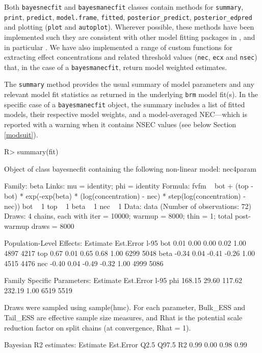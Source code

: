 \documentclass[
  shortnames]{jss}
\begin{document}
Both \texttt{bayesnecfit} and \texttt{bayesmanecfit} classes contain methods for \texttt{summary}, \texttt{print}, \texttt{predict}, \texttt{model.frame}, \texttt{fitted}, \texttt{posterior\_predict}, \texttt{posterior\_edpred} and plotting (\texttt{plot} and \newline \texttt{autoplot}). Wherever possible, these methods have been implemented such they are consistent with other model fitting packages in , and in particular . We have also implemented a range of custom functions for extracting effect concentrations and related threshold values (\texttt{nec}, \texttt{ecx} and \texttt{nsec}) that, in the case of a \texttt{bayesmanecfit}, return model weighted estimates.

The \texttt{summary} method provides the usual summary of model parameters and any relevant model fit statistics as returned in the underlying \texttt{brm} model fit(s). In the specific case of a \texttt{bayesmanecfit} object, the summary includes a list of fitted models, their respective model weights, and a model-averaged NEC---which is reported with a warning when it contains NSEC values (see below Section \ref{modsuit}).

\begin{CodeChunk}
\begin{CodeInput}
R> summary(fit)
\end{CodeInput}
\begin{CodeOutput}
Object of class bayesnecfit containing the following non-linear model: nec4param

 Family: beta 
  Links: mu = identity; phi = identity 
Formula: fvfm ~ bot + (top - bot) * exp(-exp(beta) * (log(concentration) - nec) * step(log(concentration) - nec)) 
         bot ~ 1
         top ~ 1
         beta ~ 1
         nec ~ 1
   Data: data (Number of observations: 72) 
  Draws: 4 chains, each with iter = 10000; warmup = 8000; thin = 1;
         total post-warmup draws = 8000

Population-Level Effects: 
     Estimate Est.Error l-95%
bot      0.01      0.00     0.00     0.02 1.00     4897     4217
top      0.67      0.01     0.65     0.68 1.00     6299     5048
beta    -0.34      0.04    -0.41    -0.26 1.00     4515     4476
nec     -0.40      0.04    -0.49    -0.32 1.00     4999     5086

Family Specific Parameters: 
    Estimate Est.Error l-95%
phi   168.15     29.60   117.62   232.19 1.00     6519     5519

Draws were sampled using sample(hmc). For each parameter, Bulk_ESS
and Tail_ESS are effective sample size measures, and Rhat is the potential
scale reduction factor on split chains (at convergence, Rhat = 1).


Bayesian R2 estimates:
   Estimate Est.Error Q2.5 Q97.5
R2     0.99      0.00 0.98  0.99
\end{CodeOutput}
\end{CodeChunk}
\end{document}
